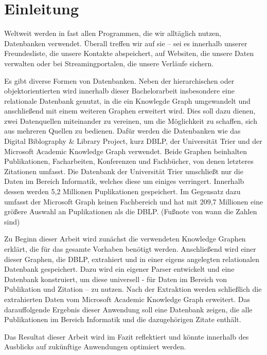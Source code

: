 \section{Einleitung}
Weltweit werden in fast allen Programmen, die wir alltäglich nutzen, Datenbanken verwendet. Überall treffen wir auf sie – sei es innerhalb unserer Freundesliste, die unsere Kontakte abspeichert,  auf Websiten, die unsere Daten verwalten oder bei Streamingportalen, die unsere Verläufe sichern. 

Es gibt diverse Formen von Datenbanken. Neben der hierarchischen oder objektorientierten wird innerhalb dieser Bachelorarbeit insbesondere eine relationale Datenbank genutzt, in die ein Knowlegde Graph umgewandelt und anschließend mit einem weiteren Graphen erweitert wird. Dies soll dazu dienen, zwei Datenquellen miteinander zu vereinen, um die Möglichkeit zu schaffen, sich aus mehreren  Quellen zu bedienen. 
Dafür werden die Datenbanken  wie das Digital Biblography \& Library Project, kurz DBLP, der Universität Trier und der Microsoft Academic Knowledge Graph verwendet. Beide Graphen beinhalten Publikationen, Facharbeiten, Konferenzen und Fachbücher, von denen letzteres Zitationen umfasst. 
Die Datenbank der Universität Trier umschließt nur die Daten im Bereich Informatik, welches diese um einiges verringert. Innerhalb dessen werden 5,2 Millionen Puplikationen gespeichert. Im Gegensatz dazu umfasst der Microsoft Graph keinen Fachbereich und hat mit 209,7 Millionen eine größere Auswahl an Puplikationen als die DBLP. (Fußnote von wann die Zahlen sind)

Zu Beginn dieser Arbeit wird zunächst die verwendeten Knowledge Graphen erklärt, die für das gesamte Vorhaben benötigt werden. Anschließend wird einer dieser Graphen, die DBLP, extrahiert und in einer eigens angelegten relationalen Datenbank gespeichert. Dazu wird ein eigener Parser entwickelt und eine Datenbank konstruiert, um diese universell - für Daten im Bereich von Publikation und Zitation – zu nutzen. 
Nach der Extraktion werden schließlich die extrahierten Daten vom Microsoft Academic Knowledge Graph erweitert. 
Das darauffolgende Ergebnis dieser Anwendung soll eine Datenbank zeigen, die alle Publikationen im Bereich Informatik  und die dazugehörigen Zitate enthält. 

Das Resultat dieser Arbeit wird im Fazit reflektiert und könnte innerhalb des Ausblicks auf zukünftige Anwendungen optimiert werden. 

\newpage
